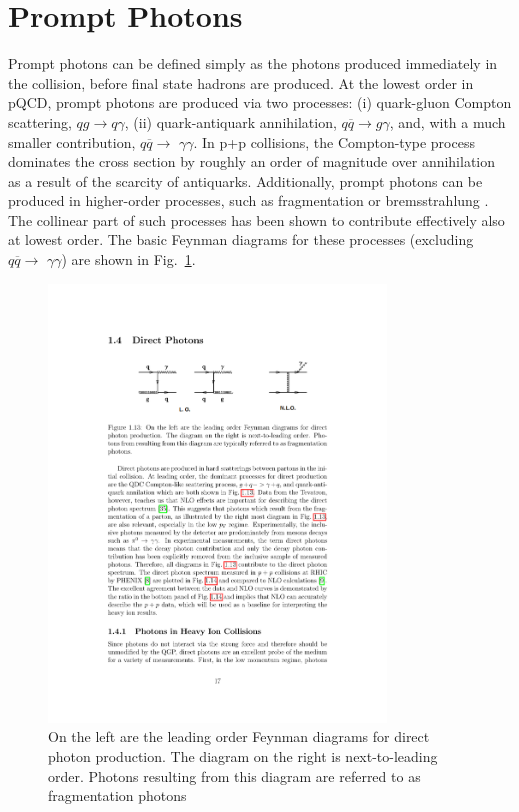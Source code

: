 \section{Prompt Photons}
Prompt photons can be defined simply as the photons produced immediately in the collision, before final state hadrons are produced. At the lowest order in pQCD, prompt photons are produced via two processes: (i) quark-gluon Compton scattering, $qg \to q\gamma$, (ii) quark-antiquark annihilation, $q\overline{q} \to g\gamma$, and, with a much smaller contribution,  $q\overline{q}\to$ $\gamma\gamma$. In p+p collisions, the Compton-type process dominates the cross section by roughly an order of magnitude over annihilation as a result of the scarcity of antiquarks. Additionally, prompt photons can be produced in higher-order processes, such as fragmentation or bremsstrahlung \cite{Aurenche1993}. The collinear part of such processes has been shown to contribute effectively also at lowest order. The basic Feynman diagrams for these processes (excluding $q\overline{q}\to$ $\gamma\gamma$) are shown in Fig.~\ref{fig:prompt_feynman}.

\begin{figure}[htpb]
  \centering
  \includegraphics[width=0.8\textwidth]{Introduction/prompt_photons.pdf}
  \caption{On the left are the leading order Feynman diagrams for direct photon production. The diagram on the right is next-to-leading order. Photons resulting from this diagram are referred to as fragmentation photons}
  \label{fig:prompt_feynman}
\end{figure}

